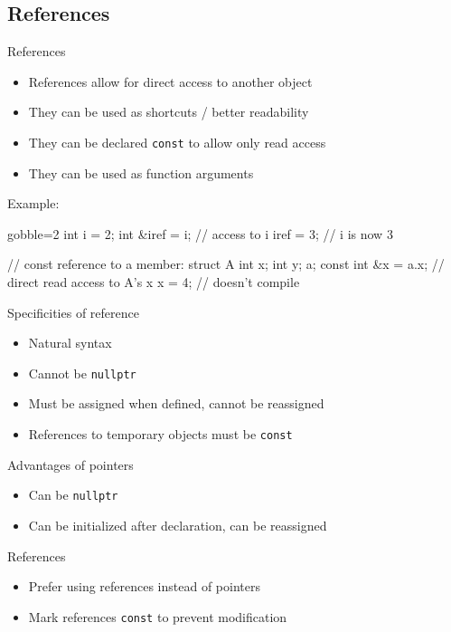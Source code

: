 \subsection[Refs]{References}

\begin{frame}[fragile]
  \begin{block}{References}
    \begin{itemize}
      \item References allow for direct access to another object
      \item They can be used as shortcuts / better readability
      \item They can be declared \texttt{const} to allow only read access
      \item They can be used as function arguments
    \end{itemize}
  \end{block}

  \begin{exampleblock}{Example:}
    \begin{cppcode*}{gobble=2}
      int i = 2;
      int &iref = i; // access to i
      iref = 3;      // i is now 3

      // const reference to a member:
      struct A { int x; int y; } a;
      const int &x = a.x; // direct read access to A's x
      x = 4;              // doesn't compile
    \end{cppcode*}
  \end{exampleblock}
\end{frame}

\begin{frame}[fragile]
  \begin{block}{Specificities of reference}
    \begin{itemize}
    \item Natural syntax
    \item Cannot be \texttt{nullptr}
    \item Must be assigned when defined, cannot be reassigned
    \item References to temporary objects must be \texttt{const}
    \end{itemize}
  \end{block}
  \begin{block}{Advantages of pointers}
    \begin{itemize}
    \item Can be \texttt{nullptr}
    \item Can be initialized after declaration, can be reassigned
    \end{itemize}
  \end{block}
  \pause
  \begin{goodpractice}{References}
    \begin{itemize}
      \item Prefer using references instead of pointers
      \item Mark references \texttt{const} to prevent modification
    \end{itemize}
  \end{goodpractice}
\end{frame}
